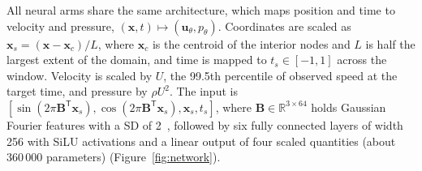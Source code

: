 \documentclass[12pt,a4paper]{article}
\newcommand{\SD}{\ac{SD}\xspace}
\theoremstyle{definition}
\numberwithin{equation}{section}
\begin{document}
All neural arms share the same architecture, which maps position and time to velocity and pressure, $(\mathbf x,t)\mapsto(\mathbf u_\theta,p_\theta)$. Coordinates are scaled as $\mathbf x_s=(\mathbf x-\mathbf x_c)/L$, where $\mathbf x_c$ is the centroid of the interior nodes and $L$ is half the largest extent of the domain, and time is mapped to $t_s\in[-1,1]$ across the window. Velocity is scaled by $U$, the 99.5th percentile of observed speed at the target time, and pressure by $\rho U^2$. The input is $[\sin(2\pi\mathbf B^{\mathsf T}\mathbf x_s),\cos(2\pi\mathbf B^{\mathsf T}\mathbf x_s),\mathbf x_s,t_s]$, where $\mathbf B\in\mathbb R^{3\times64}$ holds Gaussian Fourier features with a \SD of 2~\cite{tancik2020fourier}, followed by six fully connected layers of width 256 with SiLU activations and a linear output of four scaled quantities (about 360\,000 parameters) (Figure~\ref{fig:network}).
\end{document}
